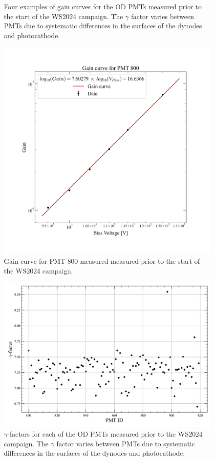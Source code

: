 \begin{figure}[ht!]
\begin{subfigure}[b]{0.47\textwidth}
     \end{subfigure}
        \caption{Four examples of gain curves for the OD PMTs measured prior to the start of the WS2024 campaign. The $\gamma$ factor varies between PMTs due to systematic differences in the surfaces of the dynodes and photocathode.}
        \label{fig:ODCommissioning/gainCurve}
\end{figure}

\begin{figure}[ht!]
    \centering
    \includegraphics[width=0.7\linewidth]{figures/ODCommissioning/PMT800_GainCurve.png}
    \caption{Gain curve for PMT 800 measured measured prior to the start of the WS2024 campaign.}
    \label{fig:ODCommissioning/PMT800_gainCurve}
\end{figure}

\begin{figure}[ht!]
    \centering
    \includegraphics[width=0.7\linewidth]{figures/ODCommissioning/gammaFactorScatterPlot.pdf}
    \caption{$\gamma$-factors for each of the OD PMTs measured prior to the WS2024 campaign. The $\gamma$ factor varies between PMTs due to systematic differences in the surfaces of the dynodes and photocathode.}
    \label{fig:ODCommissioning/gammaFactors}
\end{figure}
\fi

